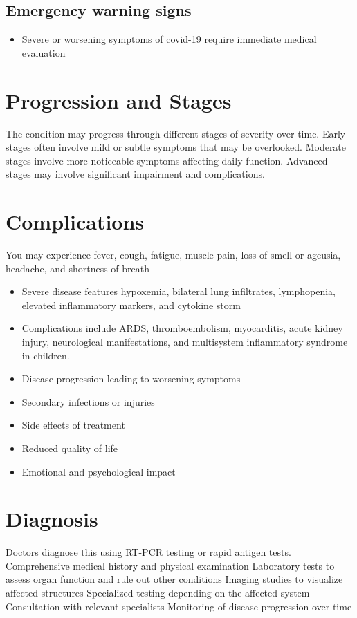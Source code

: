\subsection{Emergency warning signs}
\begin{itemize}[noitemsep]
  \item Severe or worsening symptoms of covid-19 require immediate medical evaluation
\end{itemize}
\section{Progression and Stages}
The condition may progress through different stages of severity over time. Early stages often involve mild or subtle symptoms that may be overlooked. Moderate stages involve more noticeable symptoms affecting daily function. Advanced stages may involve significant impairment and complications.
\section{Complications}
You may experience fever, cough, fatigue, muscle pain, loss of smell or ageusia, headache, and shortness of breath

\begin{itemize}[noitemsep]
  \item Severe disease features hypoxemia, bilateral lung infiltrates, lymphopenia, elevated inflammatory markers, and cytokine storm
  \item Complications include ARDS, thromboembolism, myocarditis, acute kidney injury, neurological manifestations, and multisystem inflammatory syndrome in children.
  \item Disease progression leading to worsening symptoms
  \item Secondary infections or injuries
  \item Side effects of treatment
  \item Reduced quality of life
  \item Emotional and psychological impact
\end{itemize}
\section{Diagnosis}
Doctors diagnose this using RT-PCR testing or rapid antigen tests. Comprehensive medical history and physical examination Laboratory tests to assess organ function and rule out other conditions Imaging studies to visualize affected structures Specialized testing depending on the affected system Consultation with relevant specialists Monitoring of disease progression over time

